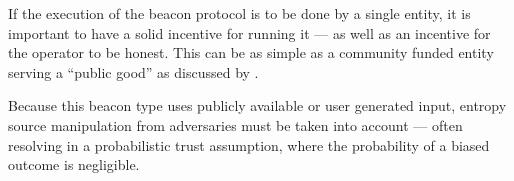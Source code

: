 If the execution of the beacon protocol is to be done by a single entity, it is important to have a solid incentive for running it --- as well as an incentive for the operator to be honest.
This can be as simple as a community funded entity serving a \enquote{public good} as discussed by \citet{bunz2017proofsof}.

Because this beacon type uses publicly available or user generated input, entropy source manipulation from adversaries must be taken into account --- often resolving in a probabilistic trust assumption, where the probability of a biased outcome is negligible.

